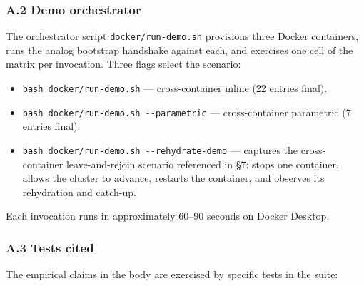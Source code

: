 \documentclass[
]{article}
\providecommand{\tightlist}{%
  \setlength{\itemsep}{0pt}\setlength{\parskip}{0pt}}
\begin{document}
\subsubsection{A.2 Demo orchestrator}\label{a.2-demo-orchestrator}

The orchestrator script \texttt{docker/run-demo.sh} provisions three
Docker containers, runs the analog bootstrap handshake against each, and
exercises one cell of the matrix per invocation. Three flags select the
scenario:

\begin{itemize}
\tightlist
\item
  \texttt{bash\ docker/run-demo.sh} --- cross-container inline (22
  entries final).
\item
  \texttt{bash\ docker/run-demo.sh\ -\/-parametric} --- cross-container
  parametric (7 entries final).
\item
  \texttt{bash\ docker/run-demo.sh\ -\/-rehydrate-demo} --- captures the
  cross-container leave-and-rejoin scenario referenced in §7: stops one
  container, allows the cluster to advance, restarts the container, and
  observes its rehydration and catch-up.
\end{itemize}

Each invocation runs in approximately 60--90 seconds on Docker Desktop.

\subsubsection{A.3 Tests cited}\label{a.3-tests-cited}

The empirical claims in the body are exercised by specific tests in the
suite:
\end{document}
